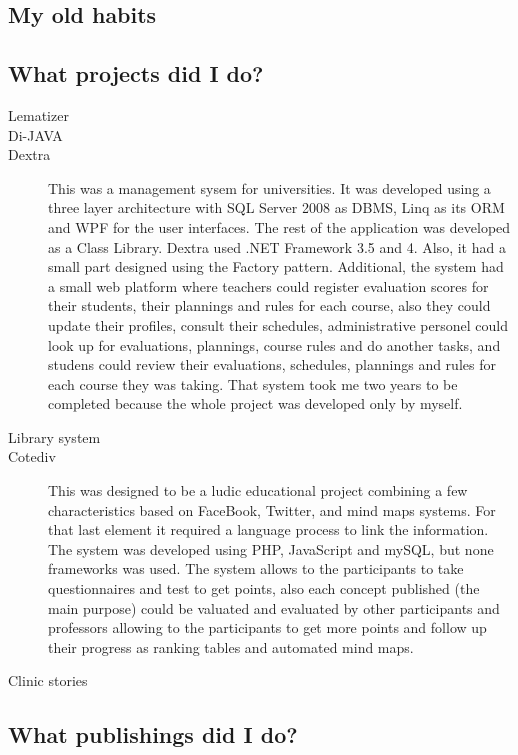 \subsection{My old habits}

\subsection{What projects did I do?}
\begin{multicols}{2}
\begin{description}
\item[Lematizer]
\item[Di-JAVA]
\item[Dextra] This was a management sysem for universities. It was developed using a three layer architecture with SQL Server 2008 as DBMS, Linq as  its ORM and WPF for the user interfaces. The rest of the application was developed as a Class Library. Dextra used .NET Framework 3.5 and 4. Also, it had a small part designed using the Factory pattern. Additional, the system had a small web platform where teachers could register evaluation scores for their students, their plannings and rules for each course, also they could update their profiles, consult their schedules, administrative personel could look up for evaluations, plannings, course rules and do another tasks, and studens could review their evaluations, schedules, plannings and rules for each course they was taking. That system took me two years to be completed because the whole project was developed only by myself.
\item[Library system]
\item[Cotediv] This was designed to be a ludic educational project combining a few characteristics based on FaceBook, Twitter, and mind maps systems. For that last element it required a language process to link the information. The system was developed using PHP, JavaScript and mySQL, but none frameworks was used. The system allows to the participants to take questionnaires and test to get points, also each concept published (the main purpose) could be valuated and evaluated by other participants and professors allowing to the participants to get more points and follow up their progress as ranking tables and automated mind maps.
\item[Clinic stories]
\end{description}
\end{multicols}
\subsection{What publishings did I do?}


